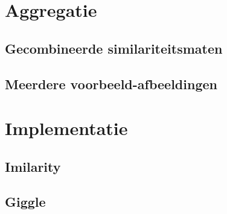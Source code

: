 \documentclass[dutch,11pt,cite,titlepage]{report}
\begin{document}


\newcommand{\auteur}{Klaas Bosteels}
\newcommand{\jaar}{2005--2006}
\newcommand{\titel}{Similariteitsgebaseerd rangschikken van afbeeldingen in zoekmachines}
\newcommand{\begeleider}{V. De Witte en S.\ Schulte}
\newcommand{\richting}{licentiaat in de informatica, optie: software-ontwikkeling}

\newcommand{\vakgroep}{Toegepaste Wiskunde en Informatica}
\newcommand{\voorzitter}{prof.\ dr.\ Guido\ Vanden\ Berghe}
\newcommand{\promotor}{prof.\ dr.\ E.\ E.\ Kerre}


\setcounter{page}{1}
\renewcommand{\baselinestretch}{1}

\tableofcontents %

\renewcommand{\baselinestretch}{1}
\setcounter{page}{1}











\chapter{Aggregatie}

\section{Gecombineerde similariteitsmaten}
\section{Meerdere voorbeeld-afbeeldingen}


\chapter{Implementatie}

\section{Imilarity}
\section{Giggle}


\nocite{*}
 

\end{document}
